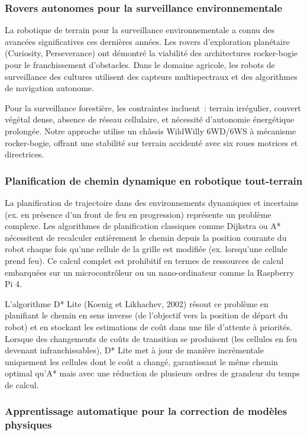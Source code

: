 \documentclass[a4paper,12pt,openany,titlepage]{scrartcl}
\begin{document}
\subsubsection{Rovers autonomes pour la surveillance environnementale}

La robotique de terrain pour la surveillance environnementale a connu des avancées significatives ces dernières années. Les rovers d'exploration planétaire (Curiosity, Perseverance) ont démontré la viabilité des architectures rocker-bogie pour le franchissement d'obstacles. Dans le domaine agricole, les robots de surveillance des cultures utilisent des capteurs multispectraux et des algorithmes de navigation autonome.

Pour la surveillance forestière, les contraintes incluent~: terrain irrégulier, couvert végétal dense, absence de réseau cellulaire, et nécessité d'autonomie énergétique prolongée. Notre approche utilise un châssis WildWilly 6WD/6WS à mécanisme rocker-bogie, offrant une stabilité sur terrain accidenté avec six roues motrices et directrices.

\subsubsection{Planification de chemin dynamique en robotique tout-terrain}

La planification de trajectoire dans des environnements dynamiques et incertains (ex. en présence d'un front de feu en progression) représente un problème complexe. Les algorithmes de planification classiques comme Dijkstra ou A* nécessitent de recalculer entièrement le chemin depuis la position courante du robot chaque fois qu'une cellule de la grille est modifiée (ex. lorsqu'une cellule prend feu). Ce calcul complet est prohibitif en termes de ressources de calcul embarquées sur un microcontrôleur ou un nano-ordinateur comme la Raspberry Pi 4.

L'algorithme D* Lite (Koenig et Likhachev, 2002) résout ce problème en planifiant le chemin en sens inverse (de l'objectif vers la position de départ du robot) et en stockant les estimations de coût dans une file d'attente à priorités. Lorsque des changements de coûts de transition se produisent (les cellules en feu devenant infranchissables), D* Lite met à jour de manière incrémentale uniquement les cellules dont le coût a changé, garantissant le même chemin optimal qu'A* mais avec une réduction de plusieurs ordres de grandeur du temps de calcul.

\subsubsection{Apprentissage automatique pour la correction de modèles physiques}
\end{document}
